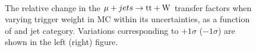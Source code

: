 \begin{figure}[!h]
  \centering
   ~~
  \\

  \caption{\label{fig:tfSyst_trigger_muToTtw} The relative change in the $\mu + jets \rightarrow \mathrm{tt+W}$ transfer
  factors when varying trigger weight in MC within its uncertainties, as a function of \scalht and jet category. 
  Variations corresponding to $+1\sigma$ ($-1\sigma$) are shown in the left (right) figure. 
  }
\end{figure}

